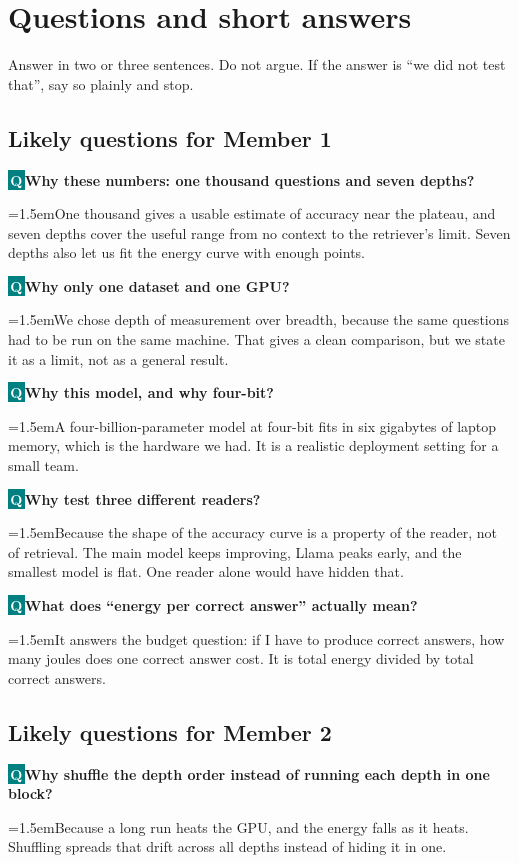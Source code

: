\documentclass[11pt,a4paper]{article}
\newcommand{\qa}[2]{%
  \needspace{4\baselineskip}%
  \par\addvspace{7pt}%
  {\noindent\colorbox{teal}{\textcolor{white}{\bfseries\,Q\,}}\;\textbf{#1}\par}%
  \addvspace{2pt}%
  {\leftskip=1.5em\relax\color{ink}#2\par}%
  \addvspace{2pt}}
\begin{document}
\newpage

\section{Questions and short answers}

{\small\color{muted}Answer in two or three sentences. Do not argue. If the answer is
``we did not test that'', say so plainly and stop.\par}

\subsection*{Likely questions for Member 1}

\qa{Why these numbers: one thousand questions and seven depths?}{One thousand gives a usable estimate of accuracy near the plateau, and seven depths cover the useful range from no context to the retriever's limit. Seven depths also let us fit the energy curve with enough points.}

\qa{Why only one dataset and one GPU?}{We chose depth of measurement over breadth, because the same questions had to be run on the same machine. That gives a clean comparison, but we state it as a limit, not as a general result.}

\qa{Why this model, and why four-bit?}{A four-billion-parameter model at four-bit fits in six gigabytes of laptop memory, which is the hardware we had. It is a realistic deployment setting for a small team.}

\qa{Why test three different readers?}{Because the shape of the accuracy curve is a property of the reader, not of retrieval. The main model keeps improving, Llama peaks early, and the smallest model is flat. One reader alone would have hidden that.}

\qa{What does ``energy per correct answer'' actually mean?}{It answers the budget question: if I have to produce correct answers, how many joules does one correct answer cost. It is total energy divided by total correct answers.}

\subsection*{Likely questions for Member 2}

\qa{Why shuffle the depth order instead of running each depth in one block?}{Because a long run heats the GPU, and the energy falls as it heats. Shuffling spreads that drift across all depths instead of hiding it in one.}
\end{document}
